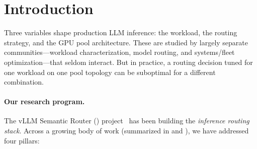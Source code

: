 \section{Introduction}
\label{sec:intro}

Three variables shape production LLM inference: the workload, the
routing strategy, and the GPU pool architecture.  These are studied by
largely separate communities---workload characterization, model
routing, and systems/fleet optimization---that seldom interact.  But in
practice, a routing decision tuned for one workload on one pool
topology can be suboptimal for a different combination.

\paragraph{Our research program.}
The vLLM Semantic Router (\vsr{}) project~\cite{vllmsr2026} has been
building the \emph{inference routing stack}.  Across a growing body
of work (summarized in  and
), we have addressed four pillars:
